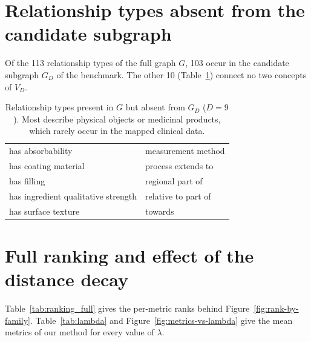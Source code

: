 \section{Relationship types absent from the candidate subgraph}
\label{app:relations}

Of the 113 relationship types of the full graph $G$, 103 occur in the candidate subgraph $G_D$ of the benchmark.
The other 10 (Table~\ref{tab:omitted-relations}) connect no two concepts of $V_D$.

\begin{table}[h]
\centering
\small
\begin{tabular}{@{}ll@{}}
\toprule
has absorbability                   & measurement method  \\
has coating material                & process extends to  \\
has filling                         & regional part of    \\
has ingredient qualitative strength & relative to part of \\
has surface texture                 & towards             \\
\bottomrule
\end{tabular}
\caption{Relationship types present in $G$ but absent from $G_D$ ($D = 9$). Most describe physical objects or medicinal products, which rarely occur in the mapped clinical data.}
\label{tab:omitted-relations}
\end{table}

\section{Full ranking and effect of the distance decay}
\label{app:ranking}
\label{app:lambda}

Table~\ref{tab:ranking_full} gives the per-metric ranks behind Figure~\ref{fig:rank-by-family}.
Table~\ref{tab:lambda} and Figure~\ref{fig:metrics-vs-lambda} give the mean metrics of our method for every value of $\lambda$.

